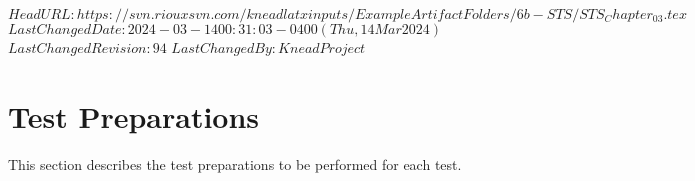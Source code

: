 \svnidlong
{$HeadURL: https://svn.riouxsvn.com/kneadlatxinputs/ExampleArtifactFolders/6b-STS/STS_Chapter_03.tex $}
{$LastChangedDate: 2024-03-14 00:31:03 -0400 (Thu, 14 Mar 2024) $}
{$LastChangedRevision: 94 $}
{$LastChangedBy: KneadProject $}


\chapter{Test Preparations}
\label{loc:TestPreparations}
% 

This section describes the test preparations to be performed for each test.


\newcommand{\StsTestID}{WiFi Packet Test}%


\renewcommand{\StsTestID}{Waterproofing Test}%


\renewcommand{\StsTestID}{Environmental Threshold Test}%
